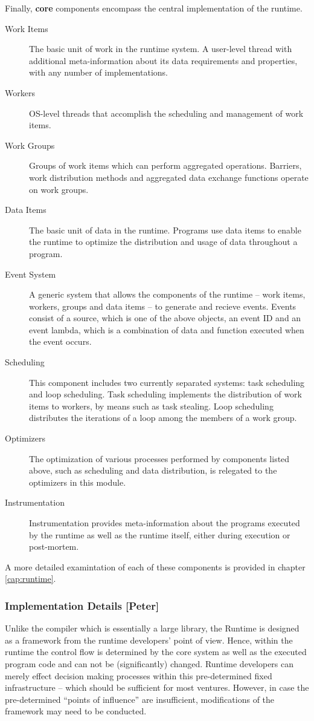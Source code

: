 Finally, \textbf{core} components encompass the central implementation of the runtime. 
\begin{description}
\item[Work Items] The basic unit of work in the runtime system. A user-level thread with additional meta-information about its data requirements and properties, with any number of implementations.
\item[Workers] OS-level threads that accomplish the scheduling and management of work items.
\item[Work Groups] Groups of work items which can perform aggregated operations. Barriers, work distribution methods and aggregated data exchange functions operate on work groups.
\item[Data Items] The basic unit of data in the runtime. Programs use data items to enable the runtime to optimize the distribution and usage of data throughout a program.
\item[Event System] A generic system that allows the components of the runtime -- work items, workers, groups and data items -- to generate and recieve events. Events consist of a source, which is one of the above objects, an event ID and an event lambda, which is a combination of data and function executed when the event occurs.
\item[Scheduling] This component includes two currently separated systems: task scheduling and loop scheduling. Task scheduling implements the distribution of work items to workers, by means such as task stealing. Loop scheduling distributes the iterations of a loop among the members of a work group.
\item[Optimizers] The optimization of various processes performed by components listed above, such as scheduling and data distribution, is relegated to the optimizers in this module.
\item[Instrumentation] Instrumentation provides meta-information about the programs executed by the runtime as well as the runtime itself, either during execution or post-mortem.
\end{description}

A more detailed examintation of each of these components is provided in chapter \ref{cap:runtime}.


\subsubsection{Implementation Details [Peter]}
Unlike the compiler which is essentially a large library, the Runtime is
designed as a framework from the runtime developers' point of view. Hence, within the runtime the control flow is determined by the core system as well as the executed program code and can not be (significantly) changed. Runtime developers can merely effect decision making processes within this pre-determined fixed infrastructure -- which should be sufficient for most ventures. However, in case the pre-determined ``points of influence'' are insufficient, modifications of the framework may need to be conducted.


